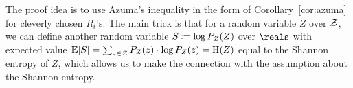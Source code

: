 The proof idea is to use Azuma's inequality in the form of
Corollary~\ref{cor:azuma} for cleverly chosen $R_i$'s. The main trick
is that for a random variable $Z$ over $\mathcal{Z}$, we can define another
random variable $S \assign \log P_Z(Z)$ over $\reals$ with expected
value $\mathbb{E}[S] = \sum_{z \in \mathcal{Z}} P_Z(z) \cdot \log P_Z(z) = \operatorname{H}(Z)$
equal to the Shannon entropy of $Z$, which allows us to make the
connection with the assumption about the Shannon entropy.


